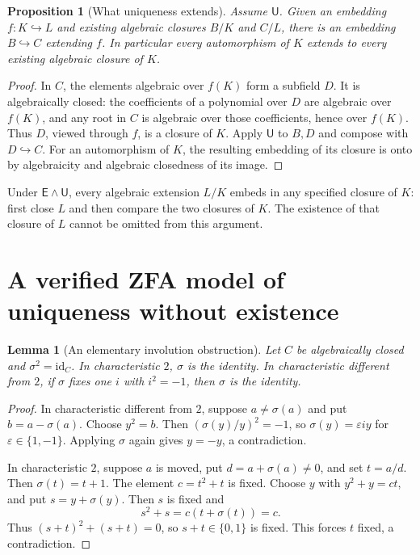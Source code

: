 \documentclass[11pt,a4paper]{article}
\newtheorem{lemma}[theorem]{Lemma}
\newtheorem{proposition}[theorem]{Proposition}
\theoremstyle{definition}\newtheorem{definition}[theorem]{Definition}
\theoremstyle{remark}\newtheorem{remark}[theorem]{Remark}
\newcommand{\E}{\mathsf E}\newcommand{\U}{\mathsf U}
\begin{document}
\begin{proposition}[What uniqueness extends]\label{prop:extend}
Assume $\U$. Given an embedding $f:K\hookrightarrow L$ and existing algebraic closures $B/K$ and $C/L$, there is an embedding $B\hookrightarrow C$ extending $f$. In particular every automorphism of $K$ extends to every existing algebraic closure of $K$.
\end{proposition}
\begin{proof}
In $C$, the elements algebraic over $f(K)$ form a subfield $D$. It is algebraically closed: the coefficients of a polynomial over $D$ are algebraic over $f(K)$, and any root in $C$ is algebraic over those coefficients, hence over $f(K)$. Thus $D$, viewed through $f$, is a closure of $K$. Apply $\U$ to $B,D$ and compose with $D\hookrightarrow C$. For an automorphism of $K$, the resulting embedding of its closure is onto by algebraicity and algebraic closedness of its image.
\end{proof}

Under $\E\wedge\U$, every algebraic extension $L/K$ embeds in any specified closure of $K$: first close $L$ and then compare the two closures of $K$. The existence of that closure of $L$ cannot be omitted from this argument.

\section{A verified ZFA model of uniqueness without existence}\label{sec:fraenkel}
\begin{lemma}[An elementary involution obstruction]\label{lem:involution}
Let $C$ be algebraically closed and $\sigma^2=\mathrm{id}_C$. In characteristic $2$, $\sigma$ is the identity. In characteristic different from $2$, if $\sigma$ fixes one $i$ with $i^2=-1$, then $\sigma$ is the identity.
\end{lemma}
\begin{proof}
In characteristic different from $2$, suppose $a\ne\sigma(a)$ and put $b=a-\sigma(a)$. Choose $y^2=b$. Then $(\sigma(y)/y)^2=-1$, so $\sigma(y)=\varepsilon i y$ for $\varepsilon\in\{1,-1\}$. Applying $\sigma$ again gives $y=-y$, a contradiction.

In characteristic $2$, suppose $a$ is moved, put $d=a+\sigma(a)\ne0$, and set $t=a/d$. Then $\sigma(t)=t+1$. The element $c=t^2+t$ is fixed. Choose $y$ with $y^2+y=ct$, and put $s=y+\sigma(y)$. Then $s$ is fixed and
\[
s^2+s=c(t+\sigma(t))=c.
\]
Thus $(s+t)^2+(s+t)=0$, so $s+t\in\{0,1\}$ is fixed. This forces $t$ fixed, a contradiction.
\end{proof}
\end{document}
